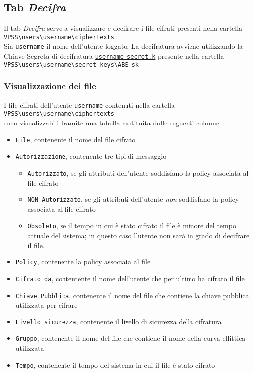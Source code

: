 \documentclass[a4paper,twoside,10pt,openany]{scrbook}
\begin{document}
\subsection{Tab \emph{Decifra}}\label{sec:tab_decifra}
%
Il tab \emph{Decifra} serve a visualizzare e decifrare i file cifrati presenti nella cartella\\
\texttt{VPSS\textbackslash users\textbackslash username\textbackslash ciphertexts}\\
Sia \texttt{username} il nome dell'utente loggato.
La decifratura avviene utilizzando la Chiave Segreta di decifratura \texttt{\hyperref[sec:format_sk]{username\_secret.k}} presente nella cartella\\
\texttt{VPSS\textbackslash users\textbackslash username\textbackslash secret\_keys\textbackslash ABE\_sk}
%
\subsubsection{Visualizzazione dei file}\label{sec:view_localct}
I file cifrati dell'utente \texttt{username} contenuti nella cartella\\
\texttt{VPSS\textbackslash users\textbackslash username\textbackslash ciphertexts}\\
sono visualizzabili tramite una tabella costituita dalle seguenti colonne
\begin{itemize}
 \item \texttt{File}, contenente il nome del file cifrato
 \item \texttt{Autorizzazione}, contenente tre tipi di messaggio
 \begin{itemize}
  \item \texttt{Autorizzato}, se gli attributi dell'utente soddisfano la policy associata al file cifrato
  \item \texttt{NON Autorizzato}, se gli attributi dell'utente \emph{non} soddisfano la policy associata al file cifrato
  \item \texttt{Obsoleto}, se il tempo in cui è stato cifrato il file è minore del tempo attuale del sistema; in questo caso l'utente non sarà in grado di decifrare il file. 
 \end{itemize}
 \item \texttt{Policy}, contenente la policy associata al file
 \item \texttt{Cifrato da}, contentente il nome dell'utente che per ultimo ha cifrato il file
 \item \texttt{Chiave Pubblica}, contenente il nome del file che contiene la chiave pubblica utilizzata per cifrare
 \item \texttt{Livello sicurezza}, contenente il livello di sicurezza della cifratura
 \item \texttt{Gruppo}, contenente il nome del file che contiene il nome della curva ellittica utilizzata
 \item \texttt{Tempo}, contenente il tempo del sistema in cui il file è stato cifrato
\end{itemize}
\end{document}
